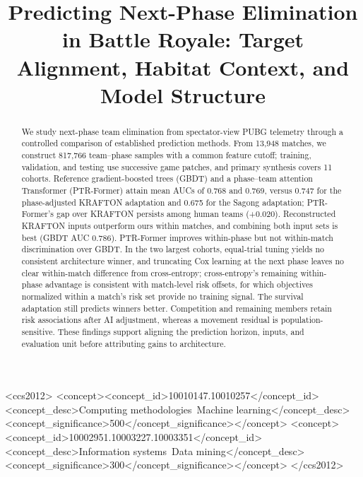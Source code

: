 \documentclass[sigconf,anonymous,nonacm]{acmart}
\begin{document}
\title[Next-Phase Elimination Risk in Battle Royale]{Predicting Next-Phase Elimination in Battle Royale: Target Alignment, Habitat Context, and Model Structure}
\begin{abstract}
We study next-phase team elimination from spectator-view PUBG telemetry through a controlled comparison of established prediction methods. From 13,948 matches, we construct 817,766 team--phase samples with a common feature cutoff; training, validation, and testing use successive game patches, and primary synthesis covers 11 cohorts. Reference gradient-boosted trees (GBDT) and a phase--team attention Transformer (PTR-Former) attain mean AUCs of 0.768 and 0.769, versus 0.747 for the phase-adjusted KRAFTON adaptation and 0.675 for the Sagong adaptation; PTR-Former's gap over KRAFTON persists among human teams (+0.020). Reconstructed KRAFTON inputs outperform ours within matches, and combining both input sets is best (GBDT AUC 0.786). PTR-Former improves within-phase but not within-match discrimination over GBDT. In the two largest cohorts, equal-trial tuning yields no consistent architecture winner, and truncating Cox learning at the next phase leaves no clear within-match difference from cross-entropy; cross-entropy's remaining within-phase advantage is consistent with match-level risk offsets, for which objectives normalized within a match's risk set provide no training signal. The survival adaptation still predicts winners better. Competition and remaining members retain risk associations after AI adjustment, whereas a movement residual is population-sensitive. These findings support aligning the prediction horizon, inputs, and evaluation unit before attributing gains to architecture.
\end{abstract}
\begin{CCSXML}
<ccs2012>
<concept><concept_id>10010147.10010257</concept_id><concept_desc>Computing methodologies~Machine learning</concept_desc><concept_significance>500</concept_significance></concept>
<concept><concept_id>10002951.10003227.10003351</concept_id><concept_desc>Information systems~Data mining</concept_desc><concept_significance>300</concept_significance></concept>
</ccs2012>
\end{CCSXML}
\maketitle
\end{document}
